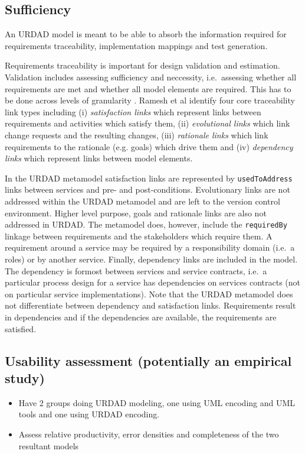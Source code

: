 
\subsection{Sufficiency}

An URDAD model is meant to be able to absorb the information required for requirements traceability, implementation mappings and test generation.

Requirements traceability is important for design validation and estimation. Validation includes assessing sufficiency and neccessity, i.e.\ assessing whether all requirements are met and whether all model elements are required. This has to be done across levels of granularity \cite{dick_design_2005}. Ramesh et al\. \cite{ramesh_toward_2001} identify four core traceability link types including (i) \emph{satisfaction links} which represent links between requirements and activities which satisfy them, (ii) \emph{evolutional links} which link change requests and the resulting changes, (iii) \emph{rationale links} which link requirements to the rationale (e.g. goals) which drive them and (iv) \emph{dependency links} which represent links between model elements.

In the URDAD metamodel satisfaction links are represented by \verb+usedToAddress+ links between services and pre- and post-conditions. Evolutionary links are not addressed within the URDAD metamodel and are left to the version control environment. Higher level purpose, goals and rationale links are also not addressed in URDAD. The metamodel does, however, include the \verb+requiredBy+ linkage between requirements and the stakeholders which require them. A requirement around a service may be required by a responsibility domain (i.e.\ a roles) or by another service. Finally, dependency links are included in the model. The dependency is formost between services and service contracts, i.e.\ a particular process design for a service has dependencies on services contracts (not on particular service implementations). Note that the URDAD metamodel does not differentiate between dependency and satisfaction links. Requirements result in dependencies and if the dependencies are available, the requirements are satisfied.





\subsection{Usability assessment (potentially an empirical study)}

\begin{itemize}
 \item Have 2 groups doing URDAD modeling, one using UML encoding and UML tools and one using URDAD encoding.
 \item Assess relative productivity, error densities and completeness of the two resultant models 
\end{itemize}

